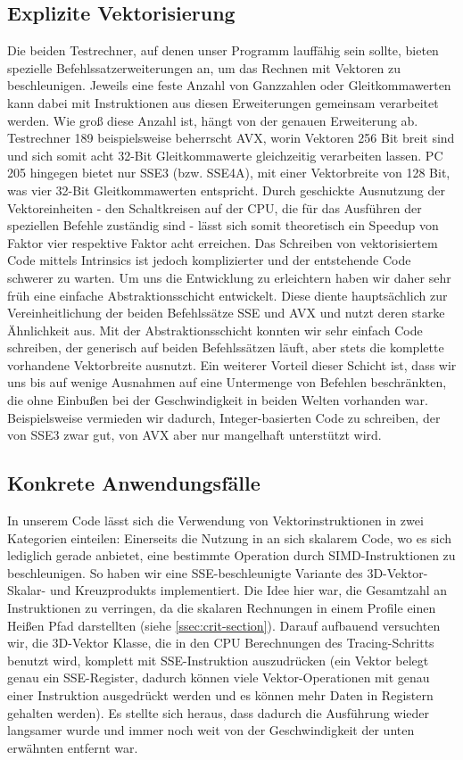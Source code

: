 \subsection{Explizite Vektorisierung}
Die beiden Testrechner, auf denen unser Programm lauffähig sein sollte, bieten spezielle Befehlssatzerweiterungen an, um das Rechnen mit Vektoren zu beschleunigen.
Jeweils eine feste Anzahl von Ganzzahlen oder Gleitkommawerten kann dabei mit Instruktionen aus diesen Erweiterungen gemeinsam verarbeitet werden.
Wie groß diese Anzahl ist, hängt von der genauen Erweiterung ab.
Testrechner 189 beispielsweise beherrscht AVX, worin Vektoren 256 Bit breit sind und sich somit acht 32-Bit Gleitkommawerte gleichzeitig verarbeiten lassen.
PC 205 hingegen bietet nur SSE3 (bzw. SSE4A), mit einer Vektorbreite von 128 Bit, was vier 32-Bit Gleitkommawerten entspricht.
Durch geschickte Ausnutzung der Vektoreinheiten - den Schaltkreisen auf der CPU, die für das Ausführen der speziellen Befehle zuständig sind - lässt sich somit theoretisch ein Speedup von Faktor vier respektive Faktor acht erreichen.
Das Schreiben von vektorisiertem Code mittels Intrinsics ist jedoch komplizierter und der entstehende Code schwerer zu warten.
Um uns die Entwicklung zu erleichtern haben wir daher sehr früh eine einfache Abstraktionsschicht entwickelt.
Diese diente hauptsächlich zur Vereinheitlichung der beiden Befehlssätze SSE und AVX und nutzt deren starke Ähnlichkeit aus.
Mit der Abstraktionsschicht konnten wir sehr einfach Code schreiben, der generisch auf beiden Befehlssätzen läuft, aber stets die komplette vorhandene Vektorbreite ausnutzt.
Ein weiterer Vorteil dieser Schicht ist, dass wir uns bis auf wenige Ausnahmen auf eine Untermenge von Befehlen beschränkten, die ohne Einbußen bei der Geschwindigkeit in beiden Welten vorhanden war.
Beispielsweise vermieden wir dadurch, Integer-basierten Code zu schreiben, der von SSE3 zwar gut, von AVX aber nur mangelhaft unterstützt wird.

\subsection{Konkrete Anwendungsfälle}
In unserem Code lässt sich die Verwendung von Vektorinstruktionen in zwei Kategorien einteilen:
Einerseits die Nutzung in an sich skalarem Code, wo es sich lediglich gerade anbietet, eine bestimmte Operation durch SIMD-Instruktionen zu beschleunigen.
So haben wir eine SSE-beschleunigte Variante des 3D-Vektor-Skalar- und Kreuzprodukts implementiert.
Die Idee hier war, die Gesamtzahl an Instruktionen zu verringen, da die skalaren Rechnungen in einem Profile einen Heißen Pfad darstellten (siehe \ref{ssec:crit-section}).
Darauf aufbauend versuchten wir, die 3D-Vektor Klasse, die in den CPU Berechnungen des Tracing-Schritts benutzt wird, komplett mit SSE-Instruktion auszudrücken (ein Vektor belegt genau ein SSE-Register, dadurch können viele Vektor-Operationen mit genau einer Instruktion ausgedrückt werden und es können mehr Daten in Registern gehalten werden).
Es stellte sich heraus, dass dadurch die Ausführung wieder langsamer wurde und immer noch weit von der Geschwindigkeit der unten erwähnten  entfernt war.

